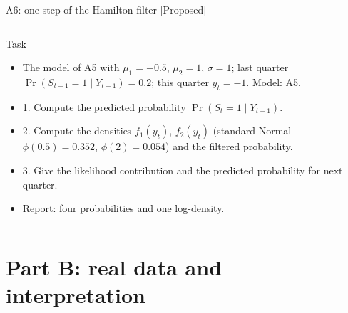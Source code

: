 \begin{frame}{A6: one step of the Hamilton filter [Proposed]}
\propsub
\itemsize{\scriptsize}
\begin{columns}[T]
\begin{column}{\taskw}
\begin{block}{Task}
\begin{itemize}
    \item The model of A5 with $\mu_1 = -0.5$, $\mu_2 = 1$, $\sigma = 1$; last quarter $\Pr(S_{t-1} = 1 \mid Y_{t-1}) = 0.2$; this quarter $y_t = -1$. Model: A5.
    \item 1. Compute the predicted probability $\Pr(S_t = 1 \mid Y_{t-1})$.
    \item 2. Compute the densities $f_1(y_t)$, $f_2(y_t)$ (standard Normal $\phi(0.5) = 0.352$, $\phi(2) = 0.054$) and the filtered probability.
    \item 3. Give the likelihood contribution and the predicted probability for next quarter.
    \item Report: four probabilities and one log-density.
\end{itemize}
\end{block}
\end{column}
\begin{column}{\solw}
\end{column}
\end{columns}
\end{frame}


\section{Part B: real data and interpretation}

